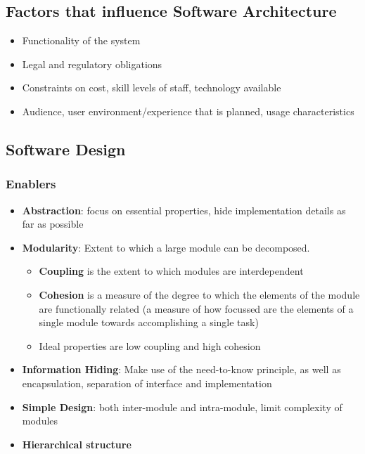 \documentclass{article}
\begin{document}
\subsection{Factors that influence Software Architecture}
\begin{itemize}
    \item Functionality of the system
    
    \item Legal and regulatory obligations
    
    \item Constraints on cost, skill levels of staff, technology available
    
    \item Audience, user environment/experience that is planned, usage characteristics
\end{itemize}

\subsection{Software Design}
\subsubsection{Enablers}
\begin{itemize}
    \item \textbf{Abstraction}: focus on essential properties, hide implementation details as far as possible
    
    \item \textbf{Modularity}: Extent to which a large module can be decomposed. 
    \begin{itemize}
        \item \textbf{Coupling} is the extent to which modules are interdependent 
        
        \item \textbf{Cohesion} is a measure of the degree to which the elements of the module are functionally related (a measure of how focussed are the elements of a single module towards accomplishing a single task)
        
        \item Ideal properties are low coupling and high cohesion
    \end{itemize} 
    
    \item \textbf{Information Hiding}: Make use of the need-to-know principle, as well as encapsulation, separation of interface and implementation
    
    \item \textbf{Simple Design}: both inter-module and intra-module, limit complexity of modules
    
    \item \textbf{Hierarchical structure}
\end{itemize}
\end{document}
